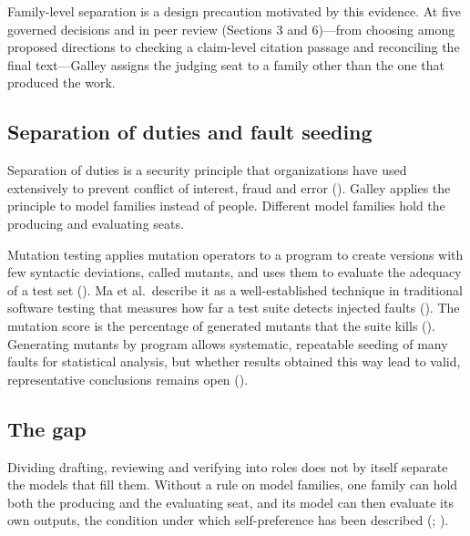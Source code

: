 \documentclass[
]{article}
\begin{document}
Family-level separation is a design precaution motivated by this
evidence. At five governed decisions and in peer review (Sections 3 and
6)---from choosing among proposed directions to checking a claim-level
citation passage and reconciling the final text---Galley assigns the
judging seat to a family other than the one that produced the work.

\subsection{Separation of duties and fault
seeding}\label{separation-of-duties-and-fault-seeding}

Separation of duties is a security principle that organizations have
used extensively to prevent conflict of interest, fraud and error
(). Galley
applies the principle to model families instead of people. Different
model families hold the producing and evaluating seats.

Mutation testing applies mutation operators to a program to create
versions with few syntactic deviations, called mutants, and uses them to
evaluate the adequacy of a test set
(). Ma et
al.~describe it as a well-established technique in traditional software
testing that measures how far a test suite detects injected faults
(). The mutation score
is the percentage of generated mutants that the suite kills
(). Generating mutants by
program allows systematic, repeatable seeding of many faults for
statistical analysis, but whether results obtained this way lead to
valid, representative conclusions remains open
().

\subsection{The gap}\label{the-gap}

Dividing drafting, reviewing and verifying into roles does not by itself
separate the models that fill them. Without a rule on model families,
one family can hold both the producing and the evaluating seat, and its
model can then evaluate its own outputs, the condition under which
self-preference has been described
(;
).
\end{document}

